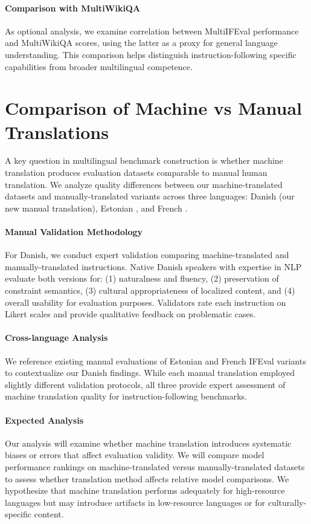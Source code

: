 \documentclass[11pt]{article}
\begin{document}
\paragraph{Comparison with MultiWikiQA}
As optional analysis, we examine correlation between MultiIFEval performance and MultiWikiQA scores, using the latter as a proxy for general language understanding. This comparison helps distinguish instruction-following specific capabilities from broader multilingual competence.

\section{Comparison of Machine vs Manual Translations}
\label{sec:comparison}

A key question in multilingual benchmark construction is whether machine translation produces evaluation datasets comparable to manual human translation. We analyze quality differences between our machine-translated datasets and manually-translated variants across three languages: Danish (our new manual translation), Estonian \cite{dorkin2025ifeval-et}, and French \cite{m-ifeval2025naacl}.

\paragraph{Manual Validation Methodology}
For Danish, we conduct expert validation comparing machine-translated and manually-translated instructions. Native Danish speakers with expertise in NLP evaluate both versions for: (1) naturalness and fluency, (2) preservation of constraint semantics, (3) cultural appropriateness of localized content, and (4) overall usability for evaluation purposes. Validators rate each instruction on Likert scales and provide qualitative feedback on problematic cases.

\paragraph{Cross-language Analysis}
We reference existing manual evaluations of Estonian \cite{dorkin2025ifeval-et} and French \cite{m-ifeval2025naacl} IFEval variants to contextualize our Danish findings. While each manual translation employed slightly different validation protocols, all three provide expert assessment of machine translation quality for instruction-following benchmarks.

\paragraph{Expected Analysis}
Our analysis will examine whether machine translation introduces systematic biases or errors that affect evaluation validity. We will compare model performance rankings on machine-translated versus manually-translated datasets to assess whether translation method affects relative model comparisons. We hypothesize that machine translation performs adequately for high-resource languages but may introduce artifacts in low-resource languages or for culturally-specific content.
\end{document}
